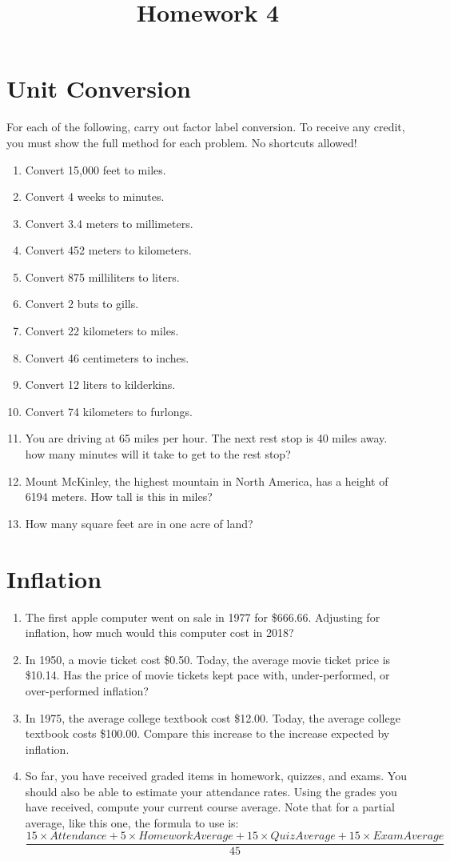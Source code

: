 \documentclass{article}
\title{Homework 4}
\date{}
\begin{document}
\maketitle

\section{Unit Conversion}
For each of the following, carry out factor label conversion.
To receive any credit, you must show the full method for each problem.
No shortcuts allowed!
\begin{enumerate}
    \item Convert 15,000 feet to miles.
    \item Convert 4 weeks to minutes.
    \item Convert 3.4 meters to millimeters.
    \item Convert 452 meters to kilometers.
    \item Convert 875 milliliters to liters.
    \item Convert 2 buts to gills.
    \item Convert 22 kilometers to miles.
    \item Convert 46 centimeters to inches.
    \item Convert 12 liters to kilderkins.
    \item Convert 74 kilometers to furlongs.
    \item You are driving at 65 miles per hour.  The next rest stop is 40 miles away.  how many minutes will it take to get to the rest stop?
    \item Mount McKinley, the highest mountain in North America, has a height of 6194 meters.  How tall is this in miles?
    \item How many square feet are in one acre of land?
\end{enumerate}

\section{Inflation}
\begin{enumerate}
    \item The first apple computer went on sale in 1977 for \$666.66.  Adjusting for inflation, how much would this computer cost in 2018?
    \item In 1950, a movie ticket cost \$0.50.  Today, the average movie ticket price is \$10.14.  Has the price of movie tickets kept pace with, under-performed, or over-performed inflation?
    \item In 1975, the average college textbook cost \$12.00.  Today, the average college textbook costs \$100.00.  Compare this increase to the increase expected by inflation.
    \item So far, you have received graded items in homework, quizzes, and exams.  You should also be able to estimate your attendance rates.  Using the grades you have received, compute your current course average. Note that for a partial average, like this one, the formula to use is:
    \[
        \displaystyle\frac{15\times Attendance + 5\times HomeworkAverage + 15 \times QuizAverage + 15 \times ExamAverage }{45}
    \]
\end{enumerate}
\end{document}

